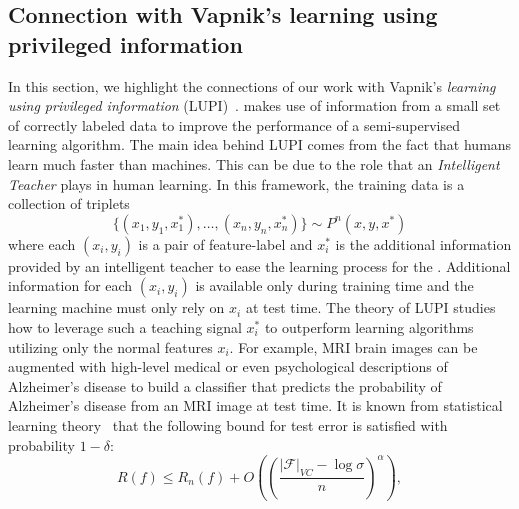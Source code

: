 \subsection{Connection with Vapnik's learning using privileged information}
\label{sec:LUPI}
In this section, we highlight the connections of our work with Vapnik's \emph{learning using privileged information} (LUPI)~\citep{vapnik2009new, vapnik2015learning}. \fwl makes use of information from a small set of correctly labeled data to improve the performance of a semi-supervised learning algorithm. The main idea behind LUPI comes from the fact that humans learn much faster than machines. This can be due to the role that an \emph{Intelligent Teacher} plays in human learning. In this framework, the training data is a collection of triplets
\begin{equation}
    \{(x_1, y_1, x_1^*),\ldots,(x_n,y_n,x_n^*)\}\mathtt{\sim}P^n(x,y,x^*)
\end{equation}
where each ${(x_i,y_i)}$ is a pair of feature-label and $x_i^*$ is the additional information provided by an intelligent teacher to ease the learning process for the \std. Additional information for each ${(x_i,y_i)}$ is available only during training time and the learning machine must only rely on $x_i$ at test time. The theory of LUPI studies how to leverage such a teaching signal $x_i^*$ to outperform learning algorithms utilizing only the normal features $x_i$. For example, MRI brain images can be augmented with high-level medical or even psychological descriptions of Alzheimer's disease to build a classifier that predicts the probability of Alzheimer's disease from an MRI image at test time.
It is known from statistical learning theory~\citep{Vapnik1998} that the following bound for test error is satisfied with probability $1-\delta$:
\begin{equation}
\label{eq:LUPI_error_bound}
    R(f) \leq R_n(f) + O\left(\left(\frac{|\mathcal{F}|_{VC}-\log \sigma}{n}\right)^\alpha\right),
\end{equation}
